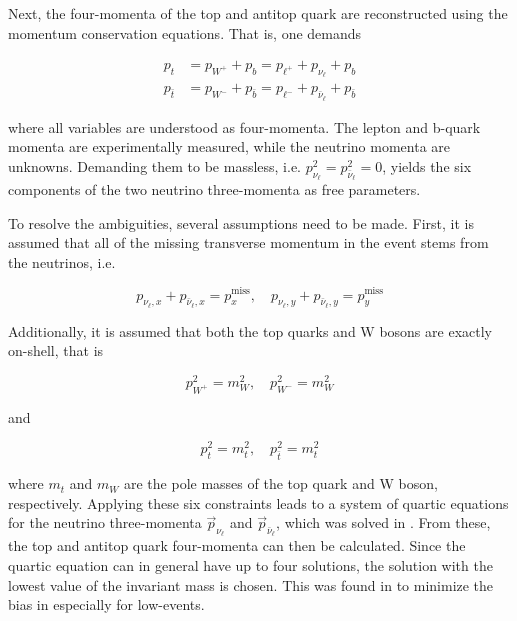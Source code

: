 Next, the four-momenta of the top and antitop quark are reconstructed using the momentum conservation equations. That is, one demands

\begin{equation}
\begin{split}
    p_t &= p_{W^+} + p_{b} = p_{\ell^+} + p_{\nu_{\ell}} + p_{b} \\
    p_{\bar{t}} &= p_{W^-} + p_{\bar{b}} = p_{\ell^-} + p_{\bar{\nu}_{\ell}} + p_{\bar{b}}
\end{split}
\end{equation}

where all variables are understood as four-momenta. The lepton and b-quark momenta are experimentally measured, while the neutrino momenta are unknowns. Demanding them to be massless, i.e. $p_{\nu_{\ell}}^2 = p_{\bar{\nu}_{\ell}}^2 = 0$, yields the six components of the two neutrino three-momenta as free parameters.

To resolve the ambiguities, several assumptions need to be made. First, it is assumed that all of the missing transverse momentum in the event stems from the neutrinos, i.e.

\begin{equation}
    p_{\nu_{\ell},x} + p_{\bar{\nu}_{\ell},x} = p_{x}^{\mathrm{miss}} , \quad p_{\nu_{\ell},y} + p_{\bar{\nu}_{\ell},y} = p_{y}^{\mathrm{miss}}
\end{equation}

Additionally, it is assumed that both the top quarks and W bosons are exactly on-shell, that is

\begin{equation}
    p_{W^+}^2 = m_W^2 , \quad p_{W^-}^2 = m_W^2
\end{equation}

and

\begin{equation}
    p_{t}^2 = m_t^2 , \quad p_{\bar{t}}^2 = m_t^2
\end{equation}

where $m_t$ and $m_W$ are the pole masses of the top quark and W boson, respectively. Applying these six constraints leads to a system of quartic equations for the neutrino three-momenta $\vec{p}_{\nu_{\ell}}$ and $\vec{p}_{\bar{\nu}_{\ell}}$, which was solved in . From these, the top and antitop quark four-momenta can then be calculated. Since the quartic equation can in general have up to four solutions, the solution with the lowest value of the invariant \ttbar mass \mtt is chosen. This was found in  to minimize the bias in \mtt especially for low-\mtt events.

